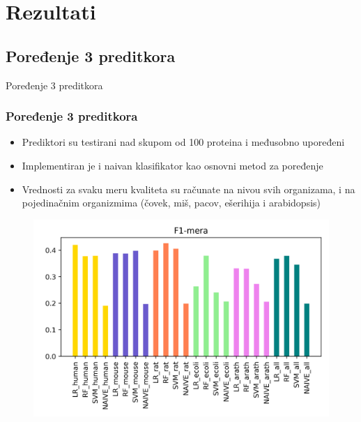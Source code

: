 \documentclass{beamer}
\begin{document}
\section{Rezultati}
\subsection{Poređenje 3 preditkora}
\begin{frame}{Poređenje 3 preditkora}
	\frametitle{Poređenje 3 preditkora}
	\begin{itemize}
		\item Prediktori su testirani nad skupom od 100 proteina i međusobno upoređeni
		
		\item Implementiran je i naivan klasifikator kao osnovni metod za poređenje 
		
		\item Vrednosti za svaku meru kvaliteta su računate na nivou svih organizama, i na pojedinačnim organizmima (čovek, miš, pacov, ešerihija i arabidopsis)
		
	\end{itemize}
	
\end{frame}


\begin{frame}
	\begin{figure}
		\includegraphics[width=\textwidth]{../Tekst/Figures/f1_poredjenje.png}
	\end{figure}
	
\end{frame}
\end{document}
